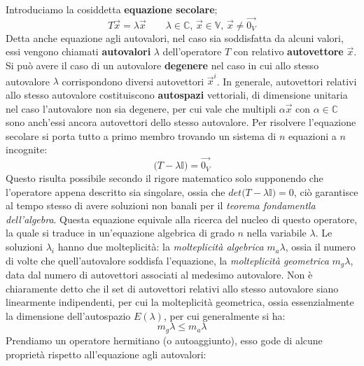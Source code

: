 Introduciamo la cosiddetta \textbf{equazione secolare};
\begin{equation}
    T\vec{x} = \lambda\vec{x} \qquad
    \lambda \in \mathbb{C}, \, \vec{x} \in \mathbb{V}, \, \vec{x}\neq\vec{0_V}
\end{equation}
Detta anche equazione agli autovalori, nel caso sia soddisfatta da alcuni valori, essi vengono chiamati \textbf{autovalori} $\lambda$ dell'operatore $T$ con relativo \textbf{autovettore} $\vec{x}$. Si può avere il caso di un autovalore \textbf{degenere} nel caso in cui allo stesso autovalore $\lambda$ corrispondono diversi autovettori $\vec{x}^i$. In generale, autovettori relativi allo stesso autovalore costituiscono \textbf{autospazi} vettoriali, di dimensione unitaria nel caso l'autovalore non sia degenere, per cui vale che multipli $\alpha\vec{x}$ con $\alpha\in\mathbb{C}$ sono anch'essi ancora autovettori dello stesso autovalore. Per risolvere l'equazione secolare si porta tutto a primo membro trovando un sistema di $n$ equazioni a $n$ incognite:
\begin{equation}
    \bigl( T-\lambda\mathbb{I} \bigr) = \vec{0_V}
\end{equation}
Questo risulta possibile secondo il rigore matematico solo supponendo che l'operatore appena descritto sia singolare, ossia che $det \bigl( T-\lambda\mathbb{I} \bigr) = 0$, ciò garantisce al tempo stesso di avere soluzioni non banali per il \textit{teorema fondamentla dell'algebra}. Questa equazione equivale alla ricerca del nucleo di questo operatore, la quale si traduce in un'equazione algebrica di grado $n$ nella variabile $\lambda$. Le soluzioni $\lambda_i$ hanno due molteplicità: la \textit{molteplicità algebrica} $m_a{\lambda}$, ossia il numero di volte che quell'autovalore soddisfa l'equazione, la \textit{molteplicità geometrica} $m_g{\lambda}$, data dal numero di autovettori associati al medesimo autovalore. Non è chiaramente detto che il set di autovettori relativi allo stesso autovalore siano linearmente indipendenti, per cui la molteplicità geometrica, ossia essenzialmente la dimensione dell'autospazio $E(\lambda)$, per cui generalmente si ha:
\begin{equation}
    m_g{\lambda} \leq m_a{\lambda}
\end{equation}
Prendiamo un operatore hermitiano (o autoaggiunto), esso gode di alcune proprietà rispetto all'equazione agli autovalori:

